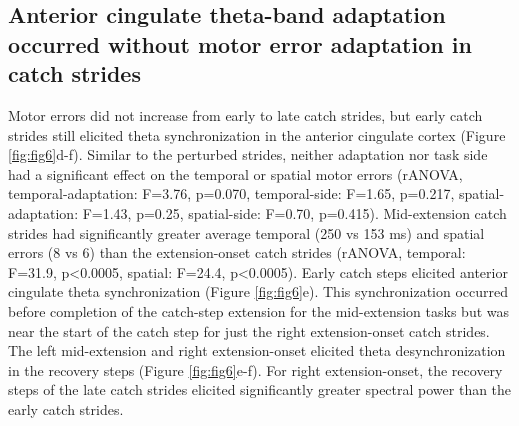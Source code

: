 \documentclass[../thesis_seyed.tex]{subfiles}
\begin{document}
\subsection{Anterior cingulate theta-band adaptation occurred without motor error adaptation in catch strides}
Motor errors did not increase from early to late catch strides, but early catch strides still elicited theta synchronization in the anterior cingulate cortex (Figure \ref{fig:fig6}d-f). Similar to the perturbed strides, neither adaptation nor task side had a significant effect on the temporal or spatial motor errors (rANOVA, temporal-adaptation: F=3.76, p=0.070, temporal-side: F=1.65, p=0.217, spatial-adaptation: F=1.43, p=0.25, spatial-side: F=0.70, p=0.415). Mid-extension catch strides had significantly greater average temporal (250 vs 153 ms) and spatial errors (8\textdegree{} vs 6\textdegree{}) than the extension-onset catch strides (rANOVA, temporal: F=31.9, p<0.0005, spatial: F=24.4, p<0.0005). Early catch steps elicited anterior cingulate theta synchronization (Figure \ref{fig:fig6}e). This synchronization occurred before completion of the catch-step extension for the mid-extension tasks but was near the start of the catch step for just the right extension-onset catch strides. The left mid-extension and right extension-onset elicited theta desynchronization in the recovery steps (Figure \ref{fig:fig6}e-f). For right extension-onset, the recovery steps of the late catch strides elicited significantly greater spectral power than the early catch strides.
\end{document}
